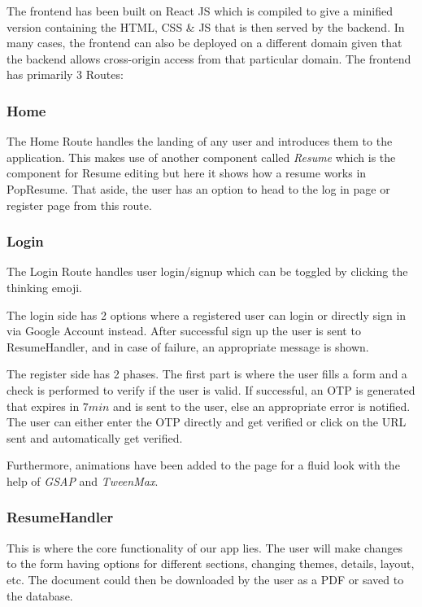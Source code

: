 \documentclass[12pt]{article}
\begin{document}
The frontend has been built on React JS which is compiled to give a minified version containing the HTML, CSS \& JS that is then served by the backend. In many cases, the frontend can also be deployed on a different domain given that the backend allows cross-origin access from that particular domain. The frontend has primarily 3 Routes:

\subsubsection*{Home}
The Home Route handles the landing of any user and introduces them to the application. This makes use of another component called \textit{Resume} which is the component for Resume editing but here it shows how a resume works in PopResume. That aside, the user has an option to head to the log in page or register page from this route.

\subsubsection*{Login}
The Login Route handles user login/signup which can be toggled by clicking the thinking emoji.\par The login side has 2 options where a registered user can login or directly sign in via Google Account instead. After successful sign up the user is sent to ResumeHandler, and in case of failure, an appropriate message is shown.\par The register side has 2 phases. The first part is where the user fills a form and a check is performed to verify if the user is valid. If successful, an OTP is generated that expires in $7 min$ and is sent to the user, else an appropriate error is notified. The user can either enter the OTP directly and get verified or click on the URL sent and automatically get verified.\par Furthermore, animations have been added to the page for a fluid look with the help of \textit{GSAP} and \textit{TweenMax}.

\subsubsection*{ResumeHandler}
This is where the core functionality of our app lies. The user will make changes to the form having options for different sections, changing themes, details, layout, etc. The document could then be downloaded by the user as a PDF or saved to the database.
\end{document}
